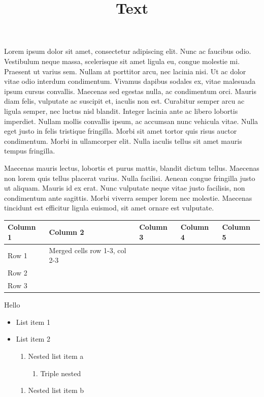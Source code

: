 \documentclass[11pt,a4paper]{article}
\title{Text}
\begin{document}
\maketitle

Lorem ipsum dolor sit amet, consectetur adipiscing elit. Nunc ac faucibus odio. Vestibulum neque massa, scelerisque sit amet ligula eu, congue molestie mi. Praesent ut varius sem. Nullam at porttitor arcu, nec lacinia nisi. Ut ac dolor vitae odio interdum condimentum. Vivamus dapibus sodales ex, vitae malesuada ipsum cursus convallis. Maecenas sed egestas nulla, ac condimentum orci. Mauris diam felis, vulputate ac suscipit et, iaculis non est. Curabitur semper arcu ac ligula semper, nec luctus nisl blandit. Integer lacinia ante ac libero lobortis imperdiet. Nullam mollis convallis ipsum, ac accumsan nunc vehicula vitae. Nulla eget justo in felis tristique fringilla. Morbi sit amet tortor quis risus auctor condimentum. Morbi in ullamcorper elit. Nulla iaculis tellus sit amet mauris tempus fringilla.

Maecenas mauris lectus, lobortis et purus mattis, blandit dictum tellus. Maecenas non lorem quis tellus placerat varius. Nulla facilisi. Aenean congue fringilla justo ut aliquam. Mauris id ex erat. Nunc vulputate neque vitae justo facilisis, non condimentum ante sagittis. Morbi viverra semper lorem nec molestie. Maecenas tincidunt est efficitur ligula euismod, sit amet ornare est vulputate.

\begin{figure}[h]
\end{figure}

\begin{table}[h]
\begin{tabular}{|l|l|l|l|l|}
\hline
Column 1 & Column 2 & Column 3 & Column 4 & Column 5 \\ \hline
Row 1 & Merged cells row 1-3, col 2-3 &  &  &  \\ \hline
Row 2 &  &  &  &  \\ \hline
Row 3 &  &  &  &  \\ \hline
\end{tabular}
\end{table}

\begin{figure}[h]
\end{figure}

Hello

\begin{itemize}
\item List item 1
\item List item 2
  \begin{enumerate}
\item Nested list item a
    \begin{enumerate}
\item Triple nested
    \end{enumerate}
  \end{enumerate}
  \begin{enumerate}
\item Nested list item b
  \end{enumerate}
\end{itemize}
\end{document}
